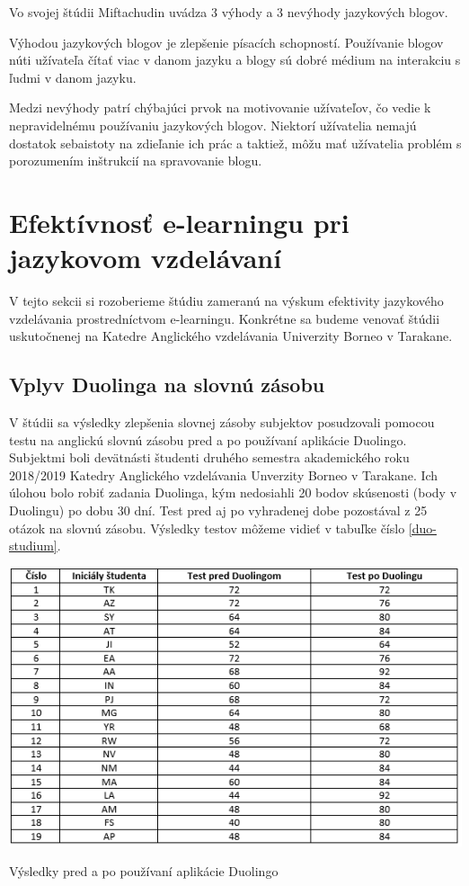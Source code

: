 \documentclass[10pt,oneside,slovak,a4paper]{article}
\begin{document}
Vo svojej štúdii Miftachudin \cite{blog-mif} uvádza 3 výhody a 3 nevýhody jazykových blogov.

Výhodou jazykových blogov je
 zlepšenie písacích schopností.
 Používanie blogov núti užívateľa čítať viac v danom jazyku a
blogy sú dobré médium na interakciu s ľudmi v danom jazyku. \cite{blog-mif}

Medzi nevýhody patrí
 chýbajúci prvok na motivovanie užívateľov, čo vedie k nepravidelnému používaniu jazykových blogov.
Niektorí užívatelia nemajú dostatok sebaistoty na zdieľanie ich prác a taktiež,
môžu mať užívatelia problém s porozumením inštrukcií na spravovanie blogu. \cite{blog-mif}



\section{Efektívnosť e-learningu pri jazykovom vzdelávaní}
\label{3}
V tejto sekcii si rozoberieme štúdiu zameranú na výskum efektivity jazykového vzdelávania prostredníctvom e-learningu. Konkrétne sa budeme venovať štúdii uskutočnenej na Katedre Anglického vzdelávania Univerzity Borneo v Tarakane.

\subsection{Vplyv Duolinga na slovnú zásobu}
V štúdii sa výsledky zlepšenia slovnej zásoby subjektov posudzovali pomocou testu na anglickú slovnú zásobu pred a po používaní aplikácie Duolingo. Subjektmi boli devätnásti študenti druhého semestra akademického roku 2018/2019 Katedry Anglického vzdelávania Unverzity Borneo v Tarakane. Ich úlohou bolo robiť zadania Duolinga, kým nedosiahli 20 bodov skúsenosti (body v Duolingu) po dobu 30 dní. Test pred aj po vyhradenej dobe pozostával z 25 otázok na slovnú zásobu. Výsledky testov môžeme vidieť v tabuľke číslo \ref{duo-studium}. \cite{duolingo}

\begin{table}[h] %
\centering
\includegraphics[width=\textwidth,height=0.35\textheight]{duo_studium.png}
\caption{Výsledky pred a po používaní aplikácie Duolingo\cite{duolingo}}
\label{duo-studium}
\end{table}
\end{document}
